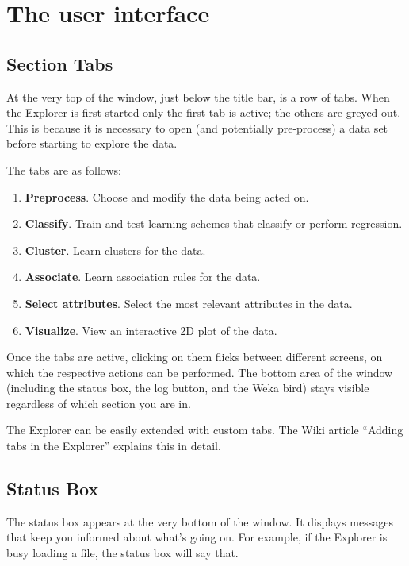 \section{The user interface}

\subsection{Section Tabs}

At the very top of the window, just below the title bar, is a row of
tabs. When the Explorer is first started only the first tab is active;
the others are greyed out. This is because it is necessary to open
(and potentially pre-process) a data set before starting to explore
the data.

The tabs are as follows:

\begin{enumerate}
\item \textbf{Preprocess}.
Choose and modify the data being acted on.
\item \textbf{Classify}.
Train and test learning schemes that classify or perform regression.
\item \textbf{Cluster}.
Learn clusters for the data.
\item \textbf{Associate}.
Learn association rules for the data.
\item \textbf{Select attributes}.
Select the most relevant attributes in the data.
\item \textbf{Visualize}.
View an interactive 2D plot of the data.
\end{enumerate}
\noindent
Once the tabs are active, clicking on them flicks between different
screens, on which the respective actions can be performed.  The bottom
area of the window (including the status box, the log button, and the
Weka bird) stays visible regardless of which section you are in.

The Explorer can be easily extended with custom tabs. The Wiki 
article ``Adding tabs in the Explorer'' \cite{explorertabs} explains
this in detail.


\subsection{Status Box}

The status box appears at the very bottom of the window. It displays
messages that keep you informed about what's going on. For example, if
the Explorer is busy loading a file, the status box will say that.

